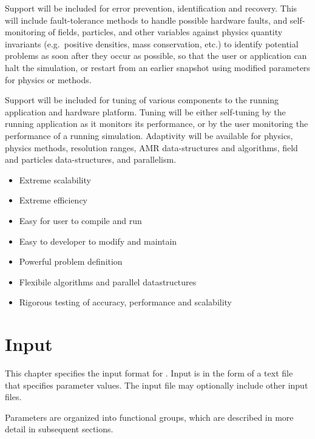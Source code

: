 \documentclass{book}
\begin{document}

   Support will be included for error prevention, identification and
   recovery.  This will include fault-tolerance methods to handle
   possible hardware faults, and self-monitoring of fields, particles,
   and other variables against physics quantity invariants
   (e.g.~positive densities, mass conservation, etc.) to identify
   potential problems as soon after they occur as possible, so that
   the user or application can halt the simulation, or restart from
   an earlier snapshot using modified parameters for physics or
   methods.


   Support will be included for tuning of various components to the
   running application and hardware platform.  Tuning will be either
   self-tuning by the running application as it monitors its
   performance, or by the user monitoring the performance of a running
   simulation.  Adaptivity will be available for physics, physics
   methods, resolution ranges, AMR data-structures and algorithms,
   field and particles data-structures, and parallelism.

\begin{itemize}
\item Extreme scalability
\item Extreme efficiency
\item Easy for user to compile and run
\item Easy to developer to modify and maintain
\item Powerful problem definition
\item Flexibile algorithms and parallel datastructures
\item Rigorous testing of accuracy, performance and scalability
\end{itemize}

\chapter{Input} \label{s:inputs}

   This chapter specifies the input format for \cello.  Input is in
   the form of a text file that specifies parameter values.  The input
   file may optionally include other input files.

   Parameters are organized into functional groups, which are described
   in more detail in subsequent sections.
\end{document}
